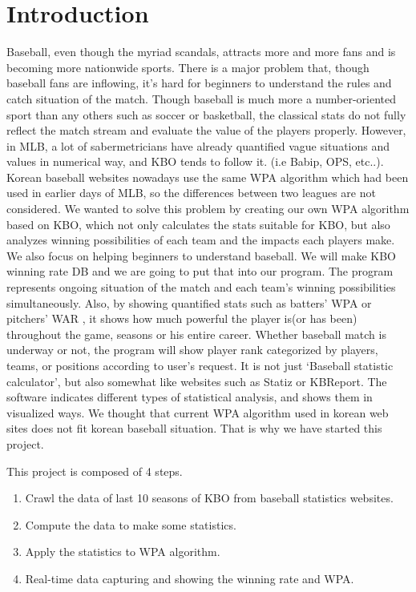 \documentclass[conference,compsoc, twocolumn]{IEEEtran}
\begin{document}
\section{Introduction}
\quad Baseball, even though the myriad scandals, attracts more and more fans and is becoming more nationwide sports. There is a major  problem that, though baseball fans are inflowing, it’s hard for beginners to understand the rules and catch situation of the match. Though baseball is much more a number-oriented sport than any others such as soccer or basketball, the classical stats do not fully reflect the match stream and evaluate the value of the players properly. However, in MLB, a lot of sabermetricians have already quantified vague situations and values in numerical way, and KBO tends to follow it. (i.e Babip, OPS, etc..). Korean baseball websites nowadays use the same WPA algorithm which had been used in earlier days of MLB, so the differences between two leagues are not considered. We wanted to solve this problem by creating our own WPA algorithm based on KBO, which not only calculates the stats suitable for KBO, but also analyzes winning possibilities of each team and the impacts each players make. We also focus on helping beginners to understand baseball.
\quad We will make KBO winning rate DB and we are going to put that into our program. The program  represents ongoing situation of the match and each team’s winning possibilities simultaneously. Also, by showing quantified stats such as batters’ WPA or pitchers’ WAR , it shows how much powerful the player is(or has been) throughout the game, seasons or his entire career. Whether baseball match is underway or not, the program will show player rank categorized by players, teams, or positions according to user’s request.
\quad It is not just ‘Baseball statistic calculator’, but also somewhat like websites such as Statiz or KBReport. The software indicates different types of statistical analysis, and shows them in visualized ways. We thought that current WPA algorithm used in korean web sites does not fit korean baseball situation. That is why we have started this project.

This project is composed of 4 steps.
\begin{enumerate}
\item Crawl the data of  last 10 seasons of KBO from baseball statistics websites. 
\item Compute the data to make some statistics.
\item Apply the statistics to WPA algorithm.
\item Real-time data capturing and showing the winning rate and WPA.
\end{enumerate}
\end{document}
